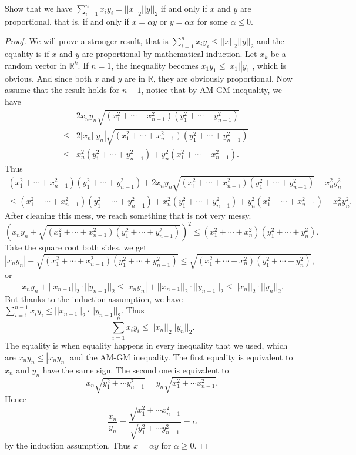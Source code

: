 \documentclass[12pt, a4paper]{article}
\theoremstyle{plain}
\newcommand{\R}{\mathbb{R}}
\begin{document}
\begin{exercise}{19}
Show that we have $\sum_{i=1}^{n}{x_iy_i}=||x||_2||y||_2$ if and only if $x$ and $y$ are proportional, that is, if and only if $x=\alpha y$ or $y=\alpha x$ for some $\alpha \leq 0$.	
\end{exercise}
	\begin{proof}
	We will prove a stronger result, that is $\sum_{i=1}^{n}{x_iy_i}\leq ||x||_2||y||_2$ and the equality is if $x$ and $y$ are proportional by mathematical induction. Let $x_{k}$ be a random vector in $\R^k$. If $n=1$, the inequality becomes $x_1y_1\leq |x_1||y_1|$, which is obvious. And since both $x$ and $y$ are in $\R$, they are obviously proportional. Now assume that the result holds for $n-1$, notice that by AM-GM inequality, we have
	\begin{align*}
	&&2x_ny_n\sqrt{(x_1^2+\cdots +x_{n-1}^2)(y_1^2+\cdots +y_{n-1}^2)}\\
	&\leq& 2|x_n||y_n|\sqrt{(x_1^2+\cdots +x_{n-1}^2)(y_1^2+\cdots +y_{n-1}^2)}\\
	&\leq& x_n^2(y_1^2+\cdots +y_{n-1}^2)+y_n^2(x_1^2+\cdots +x_{n-1}^2).
	\end{align*}
	Thus
	\begin{align*}
	(x_1^2+\cdots +x_{n-1}^2)(y_1^2+\cdots +y_{n-1}^2)+2x_ny_n\sqrt{(x_1^2+\cdots +x_{n-1}^2)(y_1^2+\cdots +y_{n-1}^2)}+x_n^2y_n^2\\
	\leq  (x_1^2+\cdots +x_{n-1}^2)(y_1^2+\cdots +y_{n-1}^2)+x_n^2(y_1^2+\cdots +y_{n-1}^2)+y_n^2(x_1^2+\cdots +x_{n-1}^2)+x_n^2y_n^2.
	\end{align*}
	After cleaning this mess, we reach something that is not very messy.
	\[
	\left(x_ny_n+\sqrt{(x_1^2+\cdots +x_{n-1}^2)(y_1^2+\cdots +y_{n-1}^2)}\right)^2\leq (x_1^2+\cdots +x_{n}^2)(y_1^2+\cdots +y_{n}^2).
	\]
	Take the square root both sides, we get
	\[
	|x_ny_n|+\sqrt{(x_1^2+\cdots +x_{n-1}^2)(y_1^2+\cdots +y_{n-1}^2)}\leq \sqrt{(x_1^2+\cdots +x_{n}^2)(y_1^2+\cdots +y_{n}^2)},
	\]
	or 
	\[
	x_ny_n+||x_{n-1}||_2\cdot ||y_{n-1}||_2\leq |x_ny_n|+||x_{n-1}||_2\cdot ||y_{n-1}||_2\leq ||x_{n}||_2\cdot ||y_{n}||_2.
	\]
	But thanks to the induction assumption, we have $\sum_{i=1}^{n-1}{x_iy_i}\leq ||x_{n-1}||_2\cdot ||y_{n-1}||_2$. Thus
	\[
	\sum_{i=1}^{n}{x_iy_i}\leq ||x_n||_2||y_n||_2.
	\]
	The equality is when equality happens in every inequality that we used, which are $x_ny_n\leq |x_ny_n|$ and the AM-GM inequality. The first equality is equivalent to $x_n$ and $y_n$ have the same sign. The second one is equivalent to 
	\[
	x_n\sqrt{y_1^2+\cdots y_{n-1}^2}=y_n\sqrt{x_1^2+\cdots x_{n-1}^2},
	\]
	Hence
	\[
	\frac{x_n}{y_n}=\frac{\sqrt{x_1^2+\cdots x_{n-1}^2}}{\sqrt{y_1^2+\cdots y_{n-1}^2}}=\alpha
	\]
	by the induction assumption. Thus $x=\alpha y$ for $\alpha \geq 0$.
	\end{proof}
\end{document}
